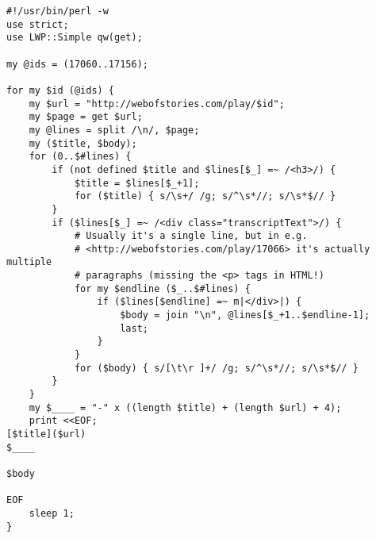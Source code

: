 \documentclass[]{article}
\begin{document}
\begin{verbatim}
#!/usr/bin/perl -w
use strict;
use LWP::Simple qw(get);

my @ids = (17060..17156);

for my $id (@ids) {
    my $url = "http://webofstories.com/play/$id";
    my $page = get $url;
    my @lines = split /\n/, $page;
    my ($title, $body);
    for (0..$#lines) {
        if (not defined $title and $lines[$_] =~ /<h3>/) {
            $title = $lines[$_+1];
            for ($title) { s/\s+/ /g; s/^\s*//; s/\s*$// }
        }
        if ($lines[$_] =~ /<div class="transcriptText">/) {
            # Usually it's a single line‚ but in e.g. 
            # <http://webofstories.com/play/17066> it's actually multiple 
            # paragraphs (missing the <p> tags in HTML!)
            for my $endline ($_..$#lines) {
                if ($lines[$endline] =~ m|</div>|) {
                    $body = join "\n", @lines[$_+1..$endline-1];
                    last;
                }
            }
            for ($body) { s/[\t\r ]+/ /g; s/^\s*//; s/\s*$// }
        }
    }
    my $____ = "-" x ((length $title) + (length $url) + 4);
    print <<EOF;
[$title]($url)
$____

$body

EOF
    sleep 1;
}
\end{verbatim}
\end{document}
